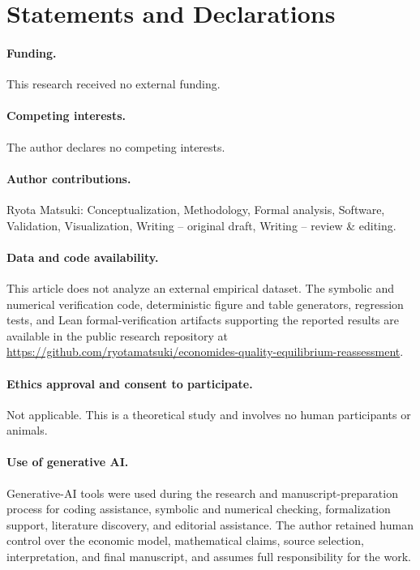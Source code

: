\section*{Statements and Declarations}

\paragraph{Funding.}
This research received no external funding.

\paragraph{Competing interests.}
The author declares no competing interests.

\paragraph{Author contributions.}
Ryota Matsuki: Conceptualization, Methodology, Formal analysis, Software, Validation, Visualization, Writing -- original draft, Writing -- review \& editing.

\paragraph{Data and code availability.}
This article does not analyze an external empirical dataset. The symbolic and numerical verification code, deterministic figure and table generators, regression tests, and Lean formal-verification artifacts supporting the reported results are available in the public research repository at \url{https://github.com/ryotamatsuki/economides-quality-equilibrium-reassessment}.

\paragraph{Ethics approval and consent to participate.}
Not applicable. This is a theoretical study and involves no human participants or animals.

\paragraph{Use of generative AI.}
Generative-AI tools were used during the research and manuscript-preparation process for coding assistance, symbolic and numerical checking, formalization support, literature discovery, and editorial assistance. The author retained human control over the economic model, mathematical claims, source selection, interpretation, and final manuscript, and assumes full responsibility for the work.
